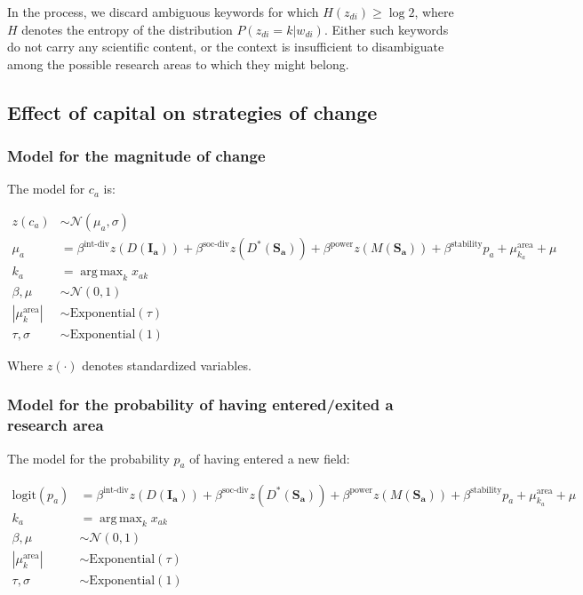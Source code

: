 \documentclass{article}
\DeclareMathOperator*{\argmax}{arg\,max}
\begin{document}
In the process, we discard ambiguous keywords for which $H(z_{di})\geq \log{2}$, where $H$ denotes the entropy of the distribution $P(z_{di}=k|w_{di})$. Either such keywords do not carry any scientific content, or the context is insufficient to disambiguate among the possible research areas to which they might belong.

\fontsize{6}{7}\selectfont\normalsize

\subsection{Effect of capital on strategies of change}

\subsubsection{\label{appendix:change-model}Model for the magnitude of change}

The model for $c_a$ is:

\begin{align*}
    z(c_a) &\sim \mathcal{N}(\mu_a,\sigma)\\
    \mu_a &= \beta^{\text{int-div}} z(D(\bm{I_a}))+\beta^{\text{soc-div}}z(D^{\ast}(\bm{S_a})) + \beta^{\text{power}} z(M(\bm{S_a})) + \beta^{\text{stability}} p_a   + \mu^{\text{area}}_{k_a} + \mu\\
    k_a &= \argmax_k x_{ak}\\
    \beta,\mu &\sim \mathcal{N}(0, 1)\\
    |\mu^{\text{area}}_k| &\sim \mathrm{Exponential}(\tau)\\
    \tau,\sigma &\sim \mathrm{Exponential}(1)
\end{align*}

Where $z(\cdot)$ denotes standardized variables.

\subsubsection{\label{appendix:enter-exit-model}Model for the probability of having  entered/exited a research area}

The model for the probability $p_a$ of having entered a new field:

\begin{align*}
    \mathrm{logit}(p_a) &= \beta^{\text{int-div}} z(D(\bm{I_a}))+\beta^{\text{soc-div}}z(D^{\ast}(\bm{S_a})) + \beta^{\text{power}} z(M(\bm{S_a})) + \beta^{\text{stability}} p_a   + \mu^{\text{area}}_{k_a} + \mu\\
    k_a &= \argmax_k x_{ak}\\
    \beta,\mu &\sim \mathcal{N}(0, 1)\\
    |\mu^{\text{area}}_k| &\sim \mathrm{Exponential}(\tau)\\
    \tau,\sigma &\sim \mathrm{Exponential}(1)
\end{align*}
\end{document}

